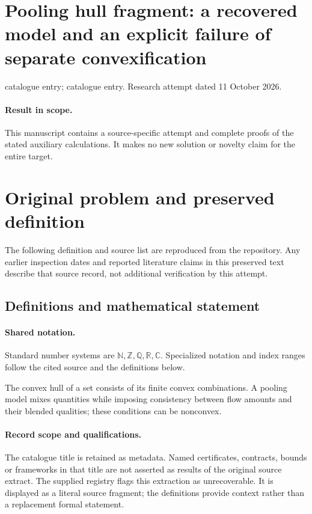 \documentclass[11pt]{article}
\begin{document}
\section*{Pooling hull fragment: a recovered model and an explicit failure of separate convexification}
\noindent catalogue entry; catalogue entry. Research attempt dated 11 October 2026.
\paragraph{Result in scope.}This manuscript contains a source-specific attempt and complete proofs of the stated auxiliary calculations. It makes no new solution or novelty claim for the entire target.
\section{Original problem and preserved definition}
The following definition and source list are reproduced from the repository. Any earlier inspection dates and reported literature claims in this preserved text describe that source record, not additional verification by this attempt.
\subsection{Definitions and mathematical statement}

\paragraph{Shared notation.}Standard number systems are $\mathbb N,\mathbb Z,\mathbb Q,\mathbb R,\mathbb C$. Specialized notation and index ranges follow the cited source and the definitions below.


The convex hull of a set consists of its finite convex combinations. A pooling model mixes quantities while imposing consistency between flow amounts and their blended qualities; these conditions can be nonconvex.
\paragraph{Record scope and qualifications.}
The catalogue title is retained as metadata. Named certificates, contracts, bounds or frameworks in that title are not asserted as results of the original source extract.
The supplied registry flags this extraction as unrecoverable. It is displayed as a literal source fragment; the definitions provide context rather than a replacement formal statement.
\end{document}
